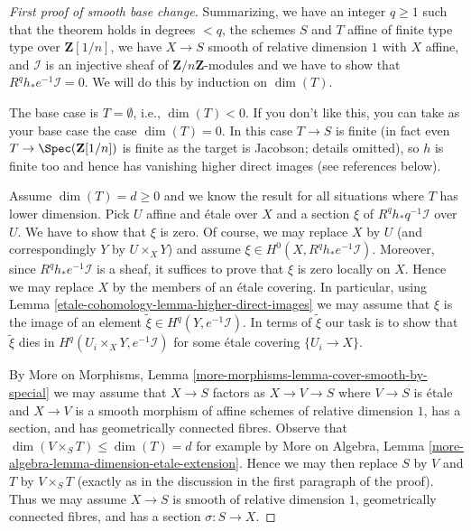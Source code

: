 \begin{proof}[First proof of smooth base change]
\medskip\noindent
Summarizing, we have an integer $q \geq 1$ such that the theorem holds
in degrees $< q$, the schemes $S$ and $T$ affine of finite type
type over $\mathbf{Z}[1/n]$, we have
$X \to S$ smooth of relative dimension $1$ with $X$ affine, and
$\mathcal{I}$ is an injective sheaf of $\mathbf{Z}/n\mathbf{Z}$-modules
and we have to show that $R^qh_*e^{-1}\mathcal{I} = 0$.
We will do this by induction on $\dim(T)$.

\medskip\noindent
The base case is $T = \emptyset$, i.e., $\dim(T) < 0$.
If you don't like this, you can take as your base case
the case $\dim(T) = 0$. In this case $T \to S$ is finite
(in fact even $T \to \Spec(\mathbf{Z}[1/n])$ is finite as the
target is Jacobson; details omitted), so
$h$ is finite too and hence has
vanishing higher direct images (see references below).

\medskip\noindent
Assume $\dim(T) = d \geq 0$ and we know the result for all situations where $T$
has lower dimension. Pick $U$ affine and \'etale over $X$ and a section $\xi$
of $R^qh_*q^{-1}\mathcal{I}$ over $U$. We have to show
that $\xi$ is zero. Of course, we may replace $X$ by $U$
(and correspondingly $Y$ by $U \times_X Y$)
and assume $\xi \in H^0(X, R^qh_*e^{-1}\mathcal{I})$.
Moreover, since $R^qh_*e^{-1}\mathcal{I}$ is a sheaf,
it suffices to prove that $\xi$ is zero locally on $X$.
Hence we may replace $X$ by the members of an \'etale covering.
In particular, using Lemma \ref{etale-cohomology-lemma-higher-direct-images}
we may assume that $\xi$ is the image of an element
$\tilde \xi \in H^q(Y, e^{-1}\mathcal{I})$.
In terms of $\tilde \xi$ our task is to show that
$\tilde \xi$ dies in $H^q(U_i \times_X Y, e^{-1}\mathcal{I})$
for some \'etale covering $\{U_i \to X\}$.

\medskip\noindent
By More on Morphisms, Lemma \ref{more-morphisms-lemma-cover-smooth-by-special}
we may assume that $X \to S$ factors as $X \to V \to S$
where $V \to S$ is \'etale and $X \to V$ is a smooth morphism
of affine schemes of relative dimension $1$, has a section, and
has geometrically connected fibres. Observe that
$\dim(V \times_S T) \leq \dim(T) = d$
for example by More on Algebra, Lemma
\ref{more-algebra-lemma-dimension-etale-extension}.
Hence we may then replace $S$ by $V$ and $T$ by $V \times_S T$
(exactly as in the discussion in the first paragraph of the proof).
Thus we may assume $X \to S$ is smooth of relative dimension $1$,
geometrically connected fibres, and has a section $\sigma : S \to X$.


\end{proof}
